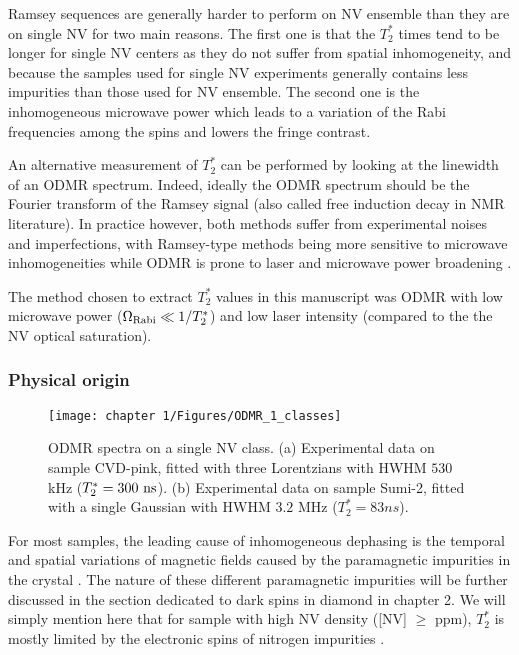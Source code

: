 \documentclass[a4paper,11pt]{report}
\begin{document}
\begin{refsection}
Ramsey sequences are generally harder to perform on NV ensemble than they are on single NV for two main reasons. The first one is that the $T_2^*$ times tend to be longer for single NV centers as they do not suffer from spatial inhomogeneity, and because the samples used for single NV experiments generally contains less impurities than those used for NV ensemble. The second one is the inhomogeneous microwave power which leads to a variation of the Rabi frequencies among the spins \citep{barry2016optical, zhou2020quantum} and lowers the fringe contrast.

An alternative measurement of $T_2^*$ can be performed by looking at the linewidth of an ODMR spectrum. Indeed, ideally the ODMR spectrum should be the Fourier transform of the Ramsey signal (also called free induction decay in NMR literature). In practice however, both methods suffer from experimental noises and imperfections, with Ramsey-type methods being more sensitive to microwave inhomogeneities \citep{barry2020sensitivity} while ODMR is prone to laser and microwave power broadening \citep{dreau2011avoiding}. 

The method chosen to extract $T_2^*$ values in this manuscript was ODMR with low microwave power ($\Omega_{\rm Rabi} \ll 1/T_2^*$) and low laser intensity (compared to the the NV optical saturation).

\subsubsection{Physical origin}

\begin{figure}[h!]
\centering
\texttt{[image: chapter 1/Figures/ODMR\_1\_classes]}
\caption{ODMR spectra on a single NV class. (a) Experimental data on sample CVD-pink, fitted with three Lorentzians with HWHM $530$ kHz ($T_2^*=300\ \rm ns$). (b) Experimental data on sample Sumi-2, fitted with a single Gaussian with HWHM $3.2$ MHz ($T_2^*=83 ns$).}
\label{ODMR 1 classe}
\end{figure}

For most samples, the leading cause of inhomogeneous dephasing is the temporal and spatial variations of magnetic fields caused by the paramagnetic impurities in the crystal \citep{barry2020sensitivity}. The nature of these different paramagnetic impurities will be further discussed in the section dedicated to dark spins in diamond in chapter 2. We will simply mention here that for sample with high NV density ([NV] $\geq$ ppm), $T_2^*$ is mostly limited by the electronic spins of nitrogen impurities \citep{bauch2018ultralong}.


\end{refsection}
\end{document}
